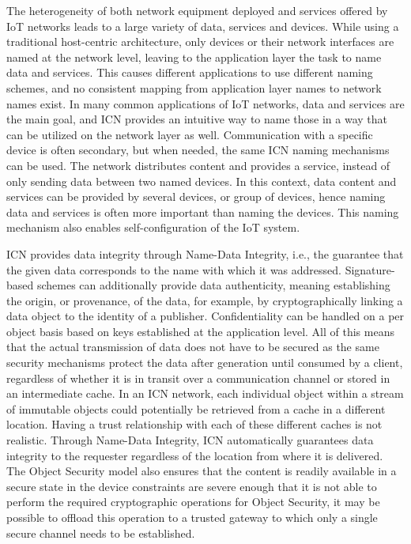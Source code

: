 The heterogeneity of both network equipment deployed and services offered by IoT networks leads to a large variety of data, services and devices. While using a traditional host-centric architecture, only devices or their network interfaces are named at the network level, leaving to the application layer the task to name data and services. This causes different applications to use different naming schemes, and no consistent mapping from application layer names to network names exist. In many common applications of IoT networks, data and services are the main goal, and ICN provides an intuitive way to name those in a way that can be utilized on the network layer as well. Communication with a specific device is often secondary, but when needed, the same ICN naming mechanisms can be used. The network distributes content and provides a service, instead of only sending data between two named devices. In this context, data content and services can be provided by several devices, or group of devices, hence naming data and services is often more important than naming the devices. This naming mechanism also enables self-configuration of the IoT system.\par
ICN provides data integrity through Name-Data Integrity, i.e., the guarantee that the given data corresponds to the name with which it was addressed. Signature-based schemes can additionally provide data authenticity, meaning establishing the origin, or provenance, of the data, for example, by cryptographically linking a data object to the identity of a publisher. Confidentiality can be handled on a per object basis based on keys established at the application level. All of this means that the actual transmission of data does not have to be secured as the same security mechanisms protect the data after generation until consumed by a client, regardless of whether it is in transit over a communication channel or stored in an intermediate cache. In an ICN network, each individual object within a stream of immutable objects could potentially be retrieved from a cache in a different location. Having a trust relationship with each of these different caches is not realistic. Through Name-Data Integrity, ICN automatically guarantees data integrity to the requester regardless of the location from where it is delivered. The Object Security model also ensures that the content is readily available in a secure state in the device constraints are severe enough that it is not able to perform the required cryptographic operations for Object Security, it may be possible to offload this operation to a trusted gateway to which only a single secure channel needs to be established. 